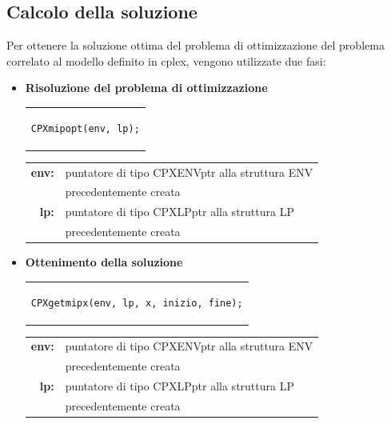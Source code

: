 \subsection{Calcolo della soluzione}
Per ottenere la soluzione ottima del problema di ottimizzazione del problema correlato al modello definito in cplex, vengono utilizzate due fasi:
\begin{itemize}
\item{\textbf{Risoluzione del problema di ottimizzazione}\\
\begin{center}
\begin{tabular}{c}
\begin{lstlisting}[linewidth=120pt, basicstyle=\footnotesize\sffamily,]
CPXmipopt(env, lp);
\end{lstlisting}
\end{tabular}
\end{center}
\begin{table}[h]
\centering
\begin{tabular}{rl}
\textbf{env:} & {puntatore di tipo CPXENVptr alla struttura ENV}\\
& {precedentemente creata}\\
\textbf{lp:} & {puntatore di tipo CPXLPptr alla struttura LP}\\
& {precedentemente creata}\\
\end{tabular}
\end{table}
}
\item{\textbf{Ottenimento della soluzione}\\
\begin{center}
\begin{tabular}{c}
\begin{lstlisting}[linewidth=230pt, basicstyle=\footnotesize\sffamily,]
CPXgetmipx(env, lp, x, inizio, fine);
\end{lstlisting}
\end{tabular}
\end{center}
\begin{table}[h]
\centering
\begin{tabular}{rl}
\textbf{env:} & {puntatore di tipo CPXENVptr alla struttura ENV}\\
& {precedentemente creata}\\
\textbf{lp:} & {puntatore di tipo CPXLPptr alla struttura LP}\\
& {precedentemente creata}\\
\end{tabular}

\end{table}}
\end{itemize}
